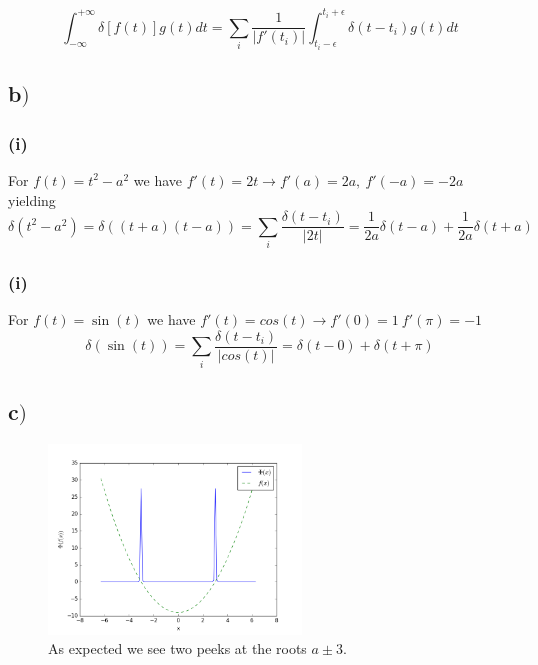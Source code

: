\documentclass{article}
\begin{document}
\begin{equation}
\int_{-\infty}^{+\infty} \delta[f(t)]g(t)dt = \sum_{i}\frac{1}{|f'(t_i)|} \int_{t_i-\epsilon}^{t_i + \epsilon} \delta(t-t_i)g(t)dt 
\end{equation}

\subsection*{b$)$}

\subsubsection*{(i)}
For $f(t) = t^2 -a^2$ we have $f'(t) = 2t \rightarrow f'(a) = 2a, \ f'(-a) = -2a$ yielding
\begin{equation}
\delta(t^2 - a^2) = \delta((t+a)(t-a)) = \sum_{i} \frac{\delta(t-t_i)}{|2t|} = \frac{1}{2a}\delta(t-a) + \frac{1}{2a}\delta(t+a)
\end{equation}

\subsubsection*{(i)}
For $f(t) = \sin(t)$ we have $f'(t) = cos(t) \rightarrow f'(0) = 1 \ f'(\pi) = -1$
\begin{equation}
\delta(\sin{(t)}) = \sum_{i} \frac{\delta(t-t_i)}{|cos(t)|} = \delta(t-0) +\delta(t+\pi)
\end{equation}


\subsection*{c$)$}

\begin{figure}[H]
\centering
\includegraphics[width=0.6\textwidth]{matmet_figure_1}
\caption{As expected we see two peeks at the roots $a \pm 3$.}
\label{fig:figure_label}
\end{figure}
\end{document}
